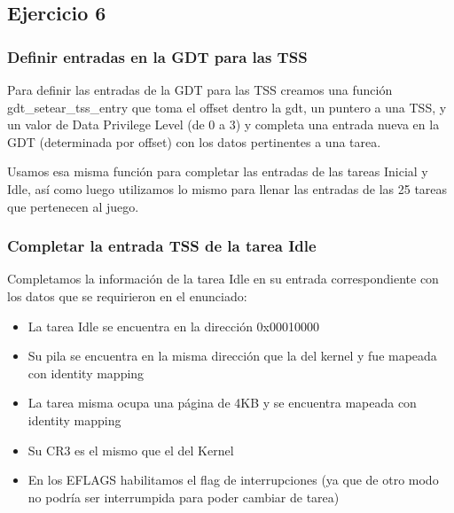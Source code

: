 \subsection{Ejercicio 6}

\subsubsection{Definir entradas en la GDT para las TSS}

Para definir las entradas de la GDT para las TSS creamos una función gdt_setear_tss_entry que toma el offset dentro la gdt, un puntero a una TSS, y un valor de Data Privilege Level (de 0 a 3) y completa una entrada nueva en la GDT (determinada por offset) con los datos pertinentes a una tarea.

Usamos esa misma función para completar las entradas de las tareas Inicial y Idle, así como luego utilizamos lo mismo para llenar las entradas de las 25 tareas que pertenecen al juego.

\subsubsection{Completar la entrada TSS de la tarea Idle}

Completamos la información de la tarea Idle en su entrada correspondiente con los datos que se requirieron en el enunciado:

\begin{itemize}
	\item La tarea Idle se encuentra en la dirección 0x00010000
	\item Su pila se encuentra en la misma dirección que la del kernel y fue mapeada con identity mapping
	\item La tarea misma ocupa una página de 4KB y se encuentra mapeada con identity mapping
	\item Su CR3 es el mismo que el del Kernel
	\item En los EFLAGS habilitamos el flag de interrupciones (ya que de otro modo no podría ser interrumpida para poder cambiar de tarea)
\end{itemize}